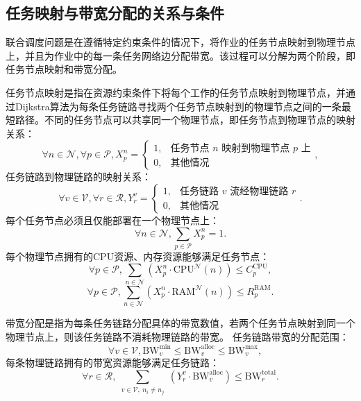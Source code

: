 \subsection{任务映射与带宽分配的关系与条件}
联合调度问题是在遵循特定约束条件的情况下，将作业的任务节点映射到物理节点上，并且为作业中的每一条任务网络边分配带宽。该过程可以分解为两个阶段，即任务节点映射和带宽分配。

任务节点映射是指在资源约束条件下将每个工作的任务节点映射到物理节点，并通过Dijkstra算法为每条任务链路寻找两个任务节点映射到的物理节点之间的一条最短路径。不同的任务节点可以共享同一个物理节点，即任务节点到物理节点的映射关系：
\begin{equation}
\forall n \in \mathcal{N}, \forall p \in \mathcal{P}, X_p^n=
\begin{cases}
1, & \text{任务节点 } n \text{ 映射到物理节点 } p \text{ 上}\\
0, & \text{其他情况}
\end{cases},
\end{equation}
任务链路到物理链路的映射关系：
\begin{equation}
\forall v \in \mathcal{V}, \forall r \in \mathcal{R}, Y_r^v=
\begin{cases}
1, & \text{任务链路 } v \text{ 流经物理链路 } r\\
0, & \text{其他情况}
\end{cases}.
\end{equation}
每个任务节点必须且仅能部署在一个物理节点上：
\begin{equation}
\forall n \in \mathcal{N}, \sum_{p \in \mathcal{P}} X_{p}^{n} = 1.
\end{equation}
每个物理节点拥有的CPU资源、内存资源能够满足任务节点：
\begin{equation}
\forall p \in \mathcal{P}, \sum_{n \in \mathcal{N}} \left( X_p^{n} \cdot \text{CPU}^\mathcal{N}(n) \right) \leq C_p^{\text{CPU}},
\end{equation}
\begin{equation}
\forall p \in \mathcal{P}, \sum_{n \in \mathcal{N}} \left( X_p^{n} \cdot \text{RAM}^\mathcal{N}(n) \right) \leq R_p^{\text{RAM}}.
\end{equation}

带宽分配是指为每条任务链路分配具体的带宽数值，若两个任务节点映射到同一个物理节点上，则该任务链路不消耗物理链路的带宽。
任务链路带宽的分配范围：
\begin{equation}
\quad \forall v \in \mathcal{V}, \text{BW}_v^{\min} \leq \text{BW}_v^{\text{alloc}} \leq \text{BW}_v^{\max}, 
\end{equation}
每条物理链路拥有的带宽资源能够满足任务链路：
\begin{equation}
\forall r \in \mathcal{R}, \sum_{\substack{v \in \mathcal{V},\ n_i \neq n_j}} \left( Y_r^v \cdot \text{BW}_v^{\text{alloc}} \right) \leq \text{BW}_r^{\text{total}}.
\end{equation}

